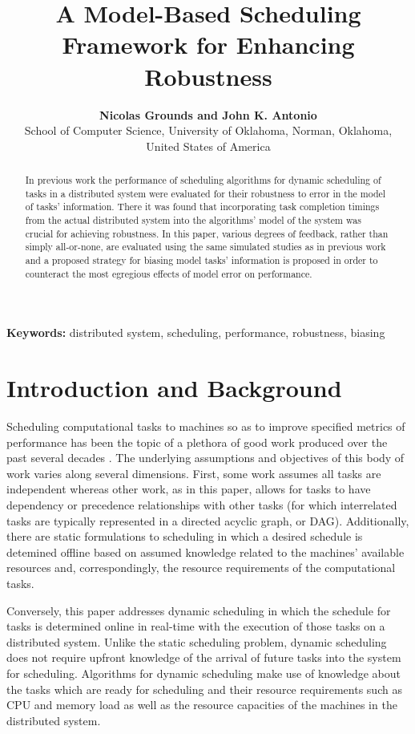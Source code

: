 \documentclass[10pt]{csce}
\title{\bf A Model-Based Scheduling Framework for Enhancing Robustness}
\author{
{\bfseries Nicolas Grounds and John K. Antonio}\\
School of Computer Science, University of Oklahoma, Norman, Oklahoma, United States of America\\
}
\begin{document}
\maketitle                        %

\begin{abstract}
In previous work the performance of scheduling algorithms for dynamic
scheduling of tasks in a distributed system were evaluated for their
robustness to error in the model of tasks' information.  There it was
found that incorporating task completion timings from the actual distributed
system into the algorithms' model of the system was crucial for achieving
robustness.  In this paper, various degrees of feedback, rather than simply
all-or-none, are evaluated using the same simulated studies as in previous
work and a proposed strategy for biasing model tasks' information is proposed
in order to counteract the most egregious effects of model error on
performance.
\end{abstract}


\vspace{1em}
\noindent\textbf{Keywords:}
 {\small distributed system, scheduling, performance, robustness, biasing}


\section{Introduction and Background}
\label{sec:Intro}

Scheduling computational tasks to machines so as to improve specified metrics
of performance has been the topic of a plethora of good work produced over the
past several decades \cite{taxonomy}. The underlying assumptions and objectives
of this body of work varies along several dimensions. First, some work assumes
all tasks are independent whereas other work, as in this paper, allows for
tasks to have dependency or precedence relationships with other tasks (for
which interrelated tasks are typically represented in a directed acyclic graph,
or DAG). Additionally, there are static formulations to scheduling in which a
desired schedule is detemined offline based on assumed knowledge related to the
machines' available resources and, correspondingly, the resource requirements
of the computational tasks.

Conversely, this paper addresses dynamic scheduling in which the schedule for
tasks is determined online in real-time with the execution of those tasks on a
distributed system. Unlike the static scheduling problem, dynamic scheduling
does not require upfront knowledge of the arrival of future tasks into the
system for scheduling. Algorithms for dynamic scheduling make use of knowledge
about the tasks which are ready for scheduling and their resource requirements
such as CPU and memory load as well as the resource capacities of the machines
in the distributed system.
\end{document}
